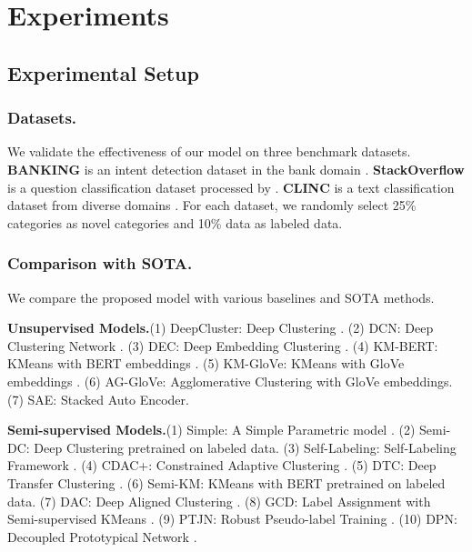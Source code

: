 \documentclass[letterpaper]{article} %
\begin{document}
\section{Experiments}
\subsection{Experimental Setup}
\subsubsection{Datasets.}
We validate the effectiveness of our model on three benchmark datasets.
\textbf{BANKING} is an intent detection dataset in the bank domain \citep{banking}.
\textbf{StackOverflow} is a question classification dataset processed by \citet{stack}.
\textbf{CLINC} is a text classification dataset from diverse domains \citep{clinc}. For each dataset, we randomly select 25\% categories as novel categories and 10\% data as labeled data.

\subsubsection{Comparison with SOTA.}
We compare the proposed model with various baselines and SOTA methods.

\noindent \textbf{Unsupervised Models.}\quad  (1) DeepCluster: Deep Clustering \citep{deepcluster}. (2) DCN: Deep Clustering Network \citep{dcn}. (3) DEC: Deep Embedding Clustering \citep{dec}. (4) KM-BERT: KMeans with BERT embeddings \citep{bert}. (5) KM-GloVe: KMeans \citep{km} with GloVe embeddings \citep{glove}. (6) AG-GloVe: Agglomerative Clustering \citep{ag} with GloVe embeddings. (7) SAE: Stacked Auto Encoder.


\noindent \textbf{Semi-supervised Models.}\quad (1) Simple: A Simple Parametric model \citep{simple}. (2) Semi-DC: Deep Clustering \citep{deepcluster} pretrained on labeled data. (3) Self-Labeling: Self-Labeling Framework \citep{selflabel}. (4) CDAC+: Constrained Adaptive Clustering \citep{thu2020}. (5) DTC: Deep Transfer Clustering \citep{dtc}. (6) Semi-KM: KMeans with BERT pretrained on labeled data. (7) DAC: Deep Aligned Clustering \citep{thu2021}. (8) GCD: Label Assignment with Semi-supervised KMeans \citep{gcd}. (9) PTJN: Robust Pseudo-label Training \citep{ptjn}. (10) DPN: Decoupled Prototypical Network \citep{dpn}.
\end{document}
